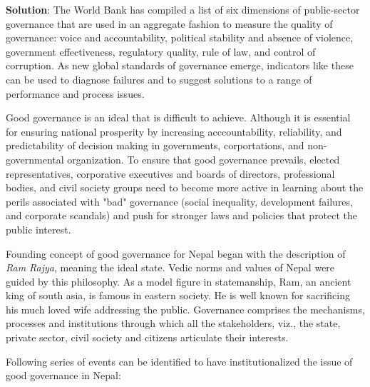 \documentclass[
  openany]{book}
\newenvironment{solution}{ {\bfseries Solution}:}{}
\begin{document}
\begin{questions}
\begin{solution}
The World Bank has compiled a list of six dimensions of public-sector governance that are used in an aggregate fashion to measure the quality of governance: voice and accountability, political stability and absence of violence, government effectiveness, regulatory quality, rule of law, and control of corruption. As new global standards of governance emerge, indicators like these can be used to diagnose failures and to suggest solutions to a range of performance and process issues.

Good governance is an ideal that is difficult to achieve. Although it is essential for ensuring national prosperity by increasing acccountability, reliability, and predictability of decision making in governments, corportations, and non-governmental organization. To ensure that good governance prevails, elected representatives, corporative executives and boards of directors, professional bodies, and civil society groups need to become more active in learning about the perils associated with "bad" governance (social inequality, development failures, and corporate scandals) and push for stronger laws and policies that protect the public interest.

Founding concept of good governance for Nepal began with the description of \textit{Ram Rajya}, meaning the ideal state. Vedic norms and values of Nepal were guided by this philosophy. As a model figure in statemanship, Ram, an ancient king of south asia, is famous in eastern society. He is well known for sacrificing his much loved wife addressing the public. Governance comprises the mechanisms, processes and institutions through which all the stakeholders, viz., the state, private sector, civil society and citizens articulate their interests.

Following series of events can be identified to have institutionalized the issue of good governance in Nepal:


\end{solution}
\end{questions}
\end{document}
